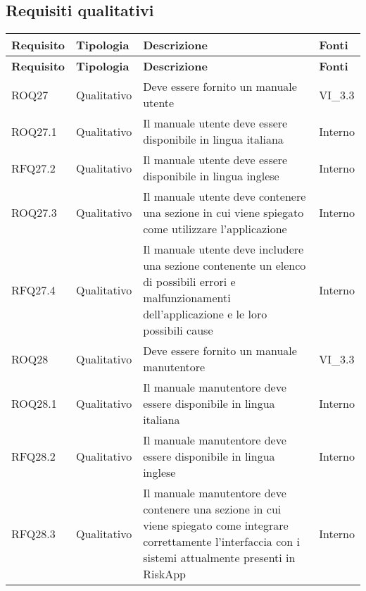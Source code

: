 \subsection{Requisiti qualitativi}
\def\arraystretch{1.5}
\begin{longtable}{p{2cm}!{\VRule[1pt]}p{2cm}!{\VRule[1pt]}p{5cm}!{\VRule[1pt]}p{1.5cm}}
\color{white} \textbf{Requisito} & \color{white} \textbf{Tipologia} & \color{white} \textbf{Descrizione} & \color{white} \textbf{Fonti} \\
\endfirsthead
{}
\color{white} \textbf{Requisito} & \color{white} \textbf{Tipologia} & \color{white} \textbf{Descrizione} & \color{white} \textbf{Fonti} \\
\endhead
ROQ27&Qualitativo\newline  & Deve essere fornito un manuale utente & VI_3.3 \\
ROQ27.1&Qualitativo\newline  & Il manuale utente deve essere disponibile in lingua italiana & Interno \\
RFQ27.2&Qualitativo\newline  & Il manuale utente deve essere disponibile in lingua inglese & Interno \\
ROQ27.3&Qualitativo\newline  & Il manuale utente deve contenere una sezione in cui viene spiegato come utilizzare l’applicazione & Interno \\
RFQ27.4&Qualitativo\newline  & Il manuale utente deve includere una sezione contenente un elenco di possibili errori e malfunzionamenti dell’applicazione e le loro possibili cause & Interno \\
ROQ28&Qualitativo\newline  & Deve essere fornito un manuale manutentore & VI_3.3 \\
ROQ28.1&Qualitativo\newline  & Il manuale manutentore deve essere disponibile in lingua italiana & Interno \\
RFQ28.2&Qualitativo\newline  & Il manuale manutentore deve essere disponibile in lingua inglese & Interno \\
RFQ28.3&Qualitativo\newline  & Il manuale manutentore deve contenere una sezione in cui viene spiegato come integrare  correttamente l’interfaccia con i sistemi attualmente presenti in RiskApp & Interno \\

\end{longtable}
